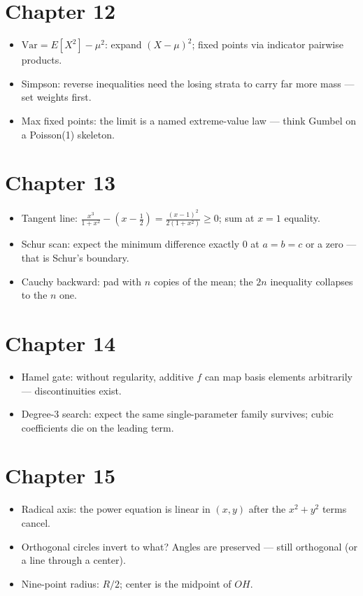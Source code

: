 \section*{Chapter 12}
\begin{itemize}
\item $\mathrm{Var}=E[X^2]-\mu^2$: expand $(X-\mu)^2$; fixed points via
indicator pairwise products.
\item Simpson: reverse inequalities need the losing strata to carry far
more mass --- set weights first.
\item Max fixed points: the limit is a named extreme-value law ---
think Gumbel on a Poisson(1) skeleton.
\end{itemize}

\section*{Chapter 13}
\begin{itemize}
\item Tangent line: $\frac{x^3}{1+x^2}-(x-\frac12)=\frac{(x-1)^2}{2(1+x^2)}
\ge0$; sum at $x=1$ equality.
\item Schur scan: expect the minimum difference exactly 0 at
$a=b=c$ or a zero --- that is Schur's boundary.
\item Cauchy backward: pad with $n$ copies of the mean; the $2n$
inequality collapses to the $n$ one.
\end{itemize}

\section*{Chapter 14}
\begin{itemize}
\item Hamel gate: without regularity, additive $f$ can map basis
elements arbitrarily --- discontinuities exist.
\item Degree-3 search: expect the same single-parameter family
survives; cubic coefficients die on the leading term.
\end{itemize}

\section*{Chapter 15}
\begin{itemize}
\item Radical axis: the power equation is linear in $(x,y)$ after the
$x^2+y^2$ terms cancel.
\item Orthogonal circles invert to what? Angles are preserved ---
still orthogonal (or a line through a center).
\item Nine-point radius: $R/2$; center is the midpoint of $OH$.
\end{itemize}

